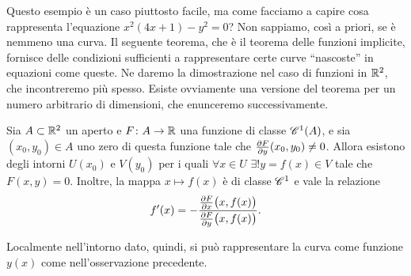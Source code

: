 Questo esempio è un caso piuttosto facile, ma come facciamo a capire cosa rappresenta l'equazione $x^2(4x+1)-y^2=0$?
Non sappiamo, così a priori, se è nemmeno una curva.
Il seguente teorema, che è il teorema delle funzioni implicite, fornisce delle condizioni sufficienti a rappresentare certe curve ``nascoste'' in equazioni come queste.
Ne daremo la dimostrazione nel caso di funzioni in $\R^2$, che incontreremo più spesso.
Esiste ovviamente una versione del teorema per un numero arbitrario di dimensioni, che enunceremo successivamente.
\begin{teorema}[Dini] \label{t:dini-R2}
	Sia $A\subset\R^2$ un aperto e $F\colon A\to\R$ una funzione di classe $\cont[1]{A}$, e sia $(x_0,y_0)\in A$ uno zero di questa funzione tale che $\drp{F}{y}(x_0,y_0)\neq 0$.
	Allora esistono degli intorni $U(x_0)$ e $V(y_0)$ per i quali $\forall x\in U$ $\exists! y=f(x)\in V$ tale che $F(x,y)=0$. Inoltre, la mappa $x\mapsto f(x)$ è di classe $\cclass[1]$ e vale la relazione
	\begin{equation}
		f'(x)=-\dfrac{\drp{F}{x}\big(x,f(x)\big)}{\drp{F}{y}\big(x,f(x)\big)}.
		\label{eq:dini-R2}
	\end{equation}
\end{teorema}
Localmente nell'intorno dato, quindi, si può rappresentare la curva come funzione $y(x)$ come nell'osservazione precedente.

